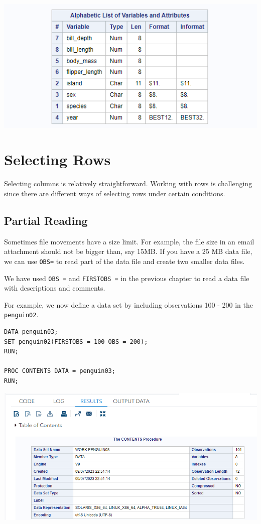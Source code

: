 \documentclass[
]{book}
\begin{document}
\begin{center}\includegraphics[width=1\linewidth]{img07/w07-penguin02Contents} \end{center}

\hypertarget{selecting-rows}{%
\section{Selecting Rows}\label{selecting-rows}}

Selecting columns is relatively straightforward. Working with rows is challenging since there are different ways of selecting rows under certain conditions.

\hypertarget{partial-reading}{%
\subsection{Partial Reading}\label{partial-reading}}

Sometimes file movements have a size limit. For example, the file size in an email attachment should not be bigger than, say 15MB. If you have a 25 MB data file, we can use \texttt{OBS=} to read part of the data file and create two smaller data files.

We have used \texttt{OBS\ =} and \texttt{FIRSTOBS\ =} in the previous chapter to read a data file with descriptions and comments.

For example, we now define a data set by including observations 100 - 200 in the \texttt{penguin02}.

\begin{verbatim}
DATA penguin03;
SET penguin02(FIRSTOBS = 100 OBS = 200);
RUN;

PROC CONTENTS DATA = penguin03;
RUN;
\end{verbatim}

\begin{center}\includegraphics[width=1\linewidth]{img07/w07-penguin03Contents} \end{center}
\end{document}
